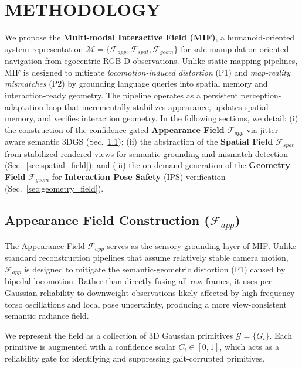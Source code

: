 \documentclass[conference]{IEEEtran}
\begin{document}
\section{METHODOLOGY}
\label{sec:methodology}
%
We propose the \textbf{Multi-modal Interactive Field (MIF)}, a humanoid-oriented system representation $\mathcal{M} = \{ \mathcal{F}_{app}, \mathcal{F}_{spat}, \mathcal{F}_{geom} \}$ for safe manipulation-oriented navigation from egocentric RGB-D observations.
%
Unlike static mapping pipelines, MIF is designed to mitigate \textit{locomotion-induced distortion} (P1) and \textit{map-reality mismatches} (P2) by grounding language queries into spatial memory and interaction-ready geometry.
%
The pipeline operates as a persistent perception-adaptation loop that incrementally stabilizes appearance, updates spatial memory, and verifies interaction geometry.
%
In the following sections, we detail:
%
(i) the construction of the confidence-gated \textbf{Appearance Field} $\mathcal{F}_{app}$ via jitter-aware semantic 3DGS (Sec.~\ref{sec:appearance_field});
%
(ii) the abstraction of the \textbf{Spatial Field} $\mathcal{F}_{spat}$ from stabilized rendered views for semantic grounding and mismatch detection (Sec.~\ref{sec:spatial_field}); and
%
(iii) the on-demand generation of the \textbf{Geometry Field} $\mathcal{F}_{geom}$ for \textbf{Interaction Pose Safety} (IPS) verification (Sec.~\ref{sec:geometry_field}).



\subsection{Appearance Field Construction ($\mathcal{F}_{app}$)}
\label{sec:appearance_field}
%
The Appearance Field $\mathcal{F}_{app}$ serves as the sensory grounding layer of MIF.
%
Unlike standard reconstruction pipelines that assume relatively stable camera motion, $\mathcal{F}_{app}$ is designed to mitigate the semantic-geometric distortion (P1) caused by bipedal locomotion.
%
Rather than directly fusing all raw frames, it uses per-Gaussian reliability to downweight observations likely affected by high-frequency torso oscillations and local pose uncertainty, producing a more view-consistent semantic radiance field.
%

We represent the field as a collection of 3D Gaussian primitives $\mathcal{G} = \{G_i\}$.
%
Each primitive is augmented with a confidence scalar $C_i \in [0, 1]$, which acts as a reliability gate for identifying and suppressing gait-corrupted primitives.
%
\end{document}
